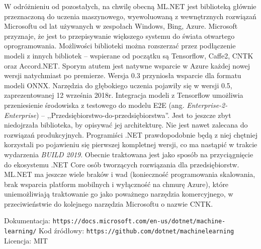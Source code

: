 \documentclass[12pt,a4paper,twoside,titlepage,openright]{book}
\begin{document}
\begin{itemize}
\begin{itemize}
W odróżnieniu od pozostałych, na chwilę obecną ML.NET jest biblioteką głównie przeznaczoną do uczenia maszynowego, wyewoluowaną z wewnętrznych rozwiązań Microsoftu od lat używanych w zespołach Windows, Bing, Azure. Microsoft przyznaje, że jest to przepisywanie większego systemu do świata otwartego oprogramowania. \cite{siteMLNet} Możliwości biblioteki można rozszerzać przez podłączenie modeli z innych bibliotek -- wspierane od początku są Tensorflow, Caffe2, CNTK oraz Accord.NET. Sporym atutem jest natywne wsparcie w Azure każdej nowej wersji natychmiast po premierze. Wersja 0.3 przyniosła wsparcie dla formatu modeli ONNX. Narzędzia do głębokiego uczenia pojawiły się w wersji 0.5, zaprezentowanej 12 września 2018r. Integracja modeli z Tensorflow umożliwia przeniesienie środowiska z testowego do modelu E2E (ang. \textit{Enterprise-2-Enterprise}) -- ,,Przedsiębiorstwo-do-przedsiębiorstwa''. Jest to jeszcze zbyt niedojrzała biblioteka, by opisywać jej architekturę. Nie jest nawet zalecana do rozwiązań produkcyjnych. Programiści .NET prawdopodobnie będą z niej chętniej korzystali po pojawieniu się pierwszej kompletnej wersji, co ma nastąpić w trakcie wydarzenia \textit{BUILD 2019}. Obecnie traktowana jest jako sposób na przyciągnięcie do ekosystemu .NET Core osób tworzących rozwiązania dla przedsiębiorstw. ML.NET ma jeszcze wiele braków i wad (konieczność programowania skalowania, brak wsparcia platform mobilnych i wyłączność na chmurę Azure), które uniemożliwiają traktowanie go jako poważnego narzędzia komercyjnego, w przeciwieństwie do kolejnego narzędzia Microsoftu o nazwie CNTK.

\noindent
\newline
Dokumentacja: \texttt{https://docs.microsoft.com/en-us/dotnet/machine-learning/}
\newline
Kod źródłowy: \texttt{https://github.com/dotnet/machinelearning}
\newline
Licencja: MIT


\end{itemize}
\end{itemize}
\end{document}
